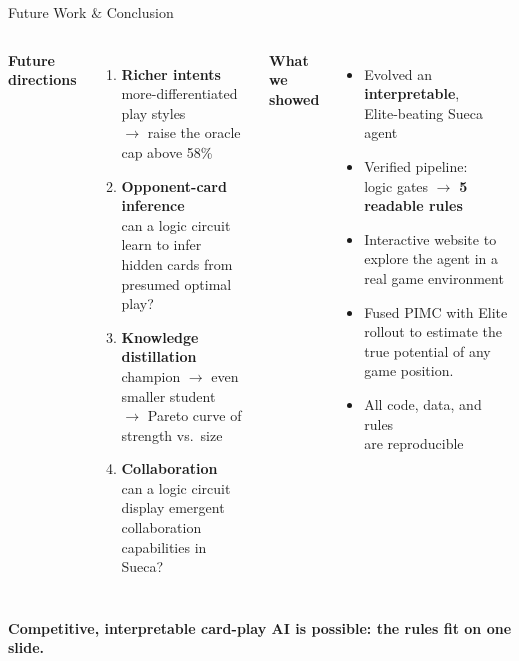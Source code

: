 \documentclass[10pt]{beamer}
\begin{document}
\begin{frame}{Future Work \& Conclusion}
  \begin{columns}[T]
      \footnotesize
      \textbf{Future directions}\\[4pt]
      \begin{enumerate}
        \item \textbf{Richer intents}\\
              more-differentiated play styles\\
              $\rightarrow$ raise the oracle cap above 58\%
        \item \textbf{Opponent-card inference}\\
              can a logic circuit learn to infer\\
              hidden cards from presumed optimal play?
        \item \textbf{Knowledge distillation}\\
              champion $\rightarrow$ even smaller student\\
              $\rightarrow$ Pareto curve of strength vs.\ size
        \item \textbf{Collaboration} \\
              can a logic circuit display emergent collaboration capabilities in Sueca?
      \end{enumerate}
      \footnotesize
      \textbf{What we showed}\\[4pt]
      \begin{itemize}
        \item Evolved an \textbf{interpretable},\\Elite-beating Sueca agent
        \item Verified pipeline:\\
              logic gates $\rightarrow$ \textbf{5 readable rules}
        \item Interactive website to explore the agent in a real game environment
        \item Fused PIMC with Elite rollout to estimate the true potential of any game position.
        \item All code, data, and rules\\are reproducible
      \end{itemize}
  \end{columns}
  \vspace{4pt}
  \centering
  \textbf{Competitive, interpretable card-play AI is possible: the rules fit on one slide.}\\[4pt]
\end{frame}
\end{document}
